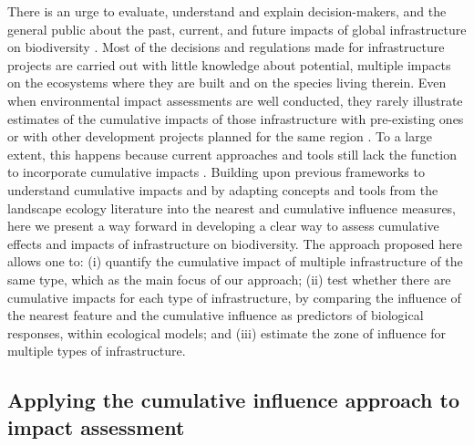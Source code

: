 \documentclass[titlepage]{article}
\begin{document}
There is an urge to evaluate, understand and explain decision-makers, and the general public about the past, current, and future impacts of global infrastructure on biodiversity \citep{laurance_conservation_2018}. Most of the decisions and regulations made for infrastructure projects are carried out with little knowledge about potential, multiple impacts on the ecosystems where they are built and on the species living therein. Even when environmental impact assessments are well conducted, they rarely illustrate estimates of the cumulative impacts of those infrastructure with pre-existing ones or with other development projects planned for the same region \citep{laurance_roads_2017, johnson_regulating_2011}. To a large extent, this happens because current approaches and tools still lack the function to incorporate cumulative impacts \citep[but see][for recent advances]{gillingham_integration_2016}. Building upon previous frameworks to understand cumulative impacts \citep{naugle_unifying_2011} and by adapting concepts and tools from the landscape ecology literature into the nearest and cumulative influence measures, here we present a way forward in developing a clear way to assess cumulative effects and impacts of infrastructure on biodiversity. The approach proposed here allows one to: (i) quantify the cumulative impact of multiple infrastructure of the same type, which as the main focus of our approach; (ii) test whether there are cumulative impacts for each type of infrastructure, by comparing the influence of the nearest feature and the cumulative influence as predictors of biological responses, within ecological models; and (iii) estimate the zone 
of influence for multiple types of infrastructure. 

\subsection{Applying the cumulative influence approach to impact assessment}
\end{document}
